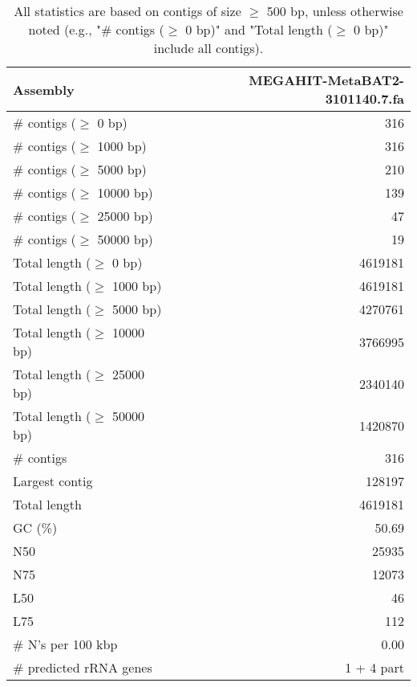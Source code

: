 \documentclass[12pt,a4paper]{article}
\begin{document}
\begin{table}[ht]
\begin{center}
\caption{All statistics are based on contigs of size $\geq$ 500 bp, unless otherwise noted (e.g., "\# contigs ($\geq$ 0 bp)" and "Total length ($\geq$ 0 bp)" include all contigs).}
\begin{tabular}{|l*{1}{|r}|}
\hline
Assembly & MEGAHIT-MetaBAT2-3101140.7.fa \\ \hline
\# contigs ($\geq$ 0 bp) & 316 \\ \hline
\# contigs ($\geq$ 1000 bp) & 316 \\ \hline
\# contigs ($\geq$ 5000 bp) & 210 \\ \hline
\# contigs ($\geq$ 10000 bp) & 139 \\ \hline
\# contigs ($\geq$ 25000 bp) & 47 \\ \hline
\# contigs ($\geq$ 50000 bp) & 19 \\ \hline
Total length ($\geq$ 0 bp) & 4619181 \\ \hline
Total length ($\geq$ 1000 bp) & 4619181 \\ \hline
Total length ($\geq$ 5000 bp) & 4270761 \\ \hline
Total length ($\geq$ 10000 bp) & 3766995 \\ \hline
Total length ($\geq$ 25000 bp) & 2340140 \\ \hline
Total length ($\geq$ 50000 bp) & 1420870 \\ \hline
\# contigs & 316 \\ \hline
Largest contig & 128197 \\ \hline
Total length & 4619181 \\ \hline
GC (\%) & 50.69 \\ \hline
N50 & 25935 \\ \hline
N75 & 12073 \\ \hline
L50 & 46 \\ \hline
L75 & 112 \\ \hline
\# N's per 100 kbp & 0.00 \\ \hline
\# predicted rRNA genes & 1 + 4 part \\ \hline
\end{tabular}
\end{center}
\end{table}
\end{document}
